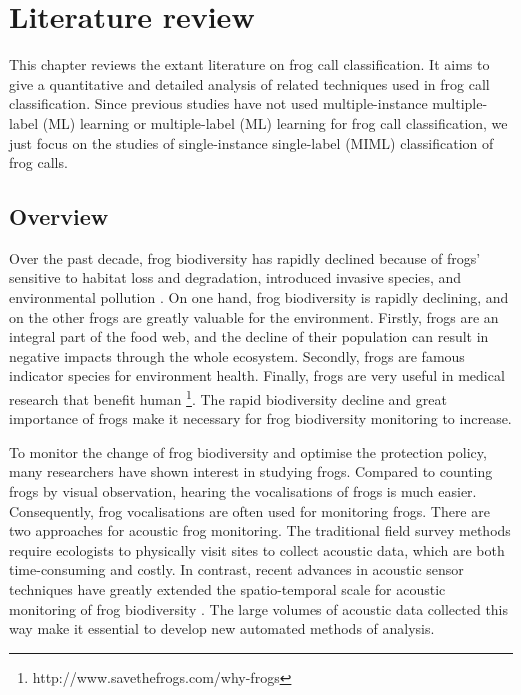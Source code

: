 
\chapter[Literature review]{Literature review}
\label{cha:cha2LiteratureReview}

This chapter reviews the extant literature on frog call classification. 
It aims to give a quantitative and detailed analysis of related techniques used in frog call classification. Since previous studies have not used multiple-instance multiple-label (ML) learning or multiple-label (ML) learning for frog call classification, we just focus on the studies of single-instance single-label (MIML) classification of frog calls.    

\section{Overview}
\label{intro}
Over the past decade, frog biodiversity has rapidly declined because of frogs' sensitive to habitat loss and degradation, introduced invasive species, and environmental pollution \citep{dudgeon2006freshwater}. On one hand, frog biodiversity is rapidly declining, and on the other frogs are greatly valuable for the environment. Firstly, frogs are an integral part of the food web, and the decline of their population can result in negative impacts through the whole ecosystem. Secondly, frogs are famous indicator species for environment health. Finally, frogs are very useful in medical research that benefit human \footnote{http://www.savethefrogs.com/why-frogs}. The rapid biodiversity decline and great importance of frogs make it necessary for frog biodiversity monitoring to increase. 

To monitor the change of frog biodiversity and optimise the protection policy, many researchers have shown interest in studying frogs. Compared to counting frogs by visual observation, hearing the vocalisations of frogs is much easier. Consequently, frog vocalisations are often used for monitoring frogs. There are two approaches for acoustic frog monitoring. The traditional field survey methods require ecologists to physically visit sites to collect acoustic data, which are both time-consuming and costly. In contrast, recent advances in acoustic sensor techniques have greatly extended the spatio-temporal scale for acoustic monitoring of frog biodiversity \citep{wimmer2013analysing}. The large volumes of acoustic data collected this way make it essential to develop new automated methods of analysis. 


